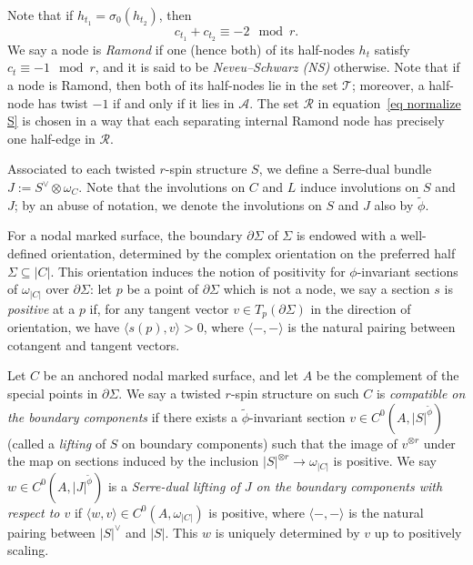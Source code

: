 \documentclass[11pt,a4paper]{article}
\theoremstyle{definition}
\theoremstyle{remark}
\numberwithin{equation}{section}
\begin{document}
Note that if $h_{t_1}=\sigma_0(h_{t_2})$, then
\begin{equation}\label{eq sum of twist at node}c_{t_1} + c_{t_2} \equiv -2 \mod r.\end{equation}
We say a node is \textit{Ramond} if one (hence both) of its half-nodes $h_t$ satisfy $c_t \equiv -1 \mod r$,  and it is said to be \textit{Neveu--Schwarz (NS)} otherwise. Note that if a node is Ramond, then both of its half-nodes lie in the set $\mathcal T$; moreover, a half-node has twist $-1$ if and only if it lies in $\mathcal A$. The set $\mathcal{R}$ in equation~\eqref{eq normalize S} is chosen in a way that each separating internal Ramond node has precisely one half-edge in $\mathcal{R}.$ 


Associated to each twisted $r$-spin structure $S$, we define a Serre-dual bundle $J:=S^{\vee} \otimes \omega_{C}$. Note that the involutions on $C$ and $L$ induce involutions on $S$ and $J$; by an abuse of notation, we denote the involutions on $S$ and $J$ also by $\widetilde{\phi}$.

For a nodal marked surface, the boundary ${\partial}\Sigma$ of $\Sigma$ is endowed with a well-defined orientation, determined by the complex orientation on the preferred half $\Sigma \subseteq |C|$. This orientation induces the notion of positivity for $\phi$-invariant sections of $\omega_{|C|}$ over ${\partial} \Sigma$: let $p$ be a point of $\partial \Sigma$ which is not a node, we say a section $s$ is \textit{positive} at a $p$ if, for any tangent vector $v \in T_p({\partial} \Sigma)$ in the direction of orientation, we have $\langle s(p), v \rangle > 0$, where $\langle -, - \rangle$ is the natural pairing between cotangent and tangent vectors.



Let $C$ be an anchored nodal marked surface, and let $A$ be the complement of the special points in $\partial \Sigma$.  We say a twisted $r$-spin structure on such $C$ is \textit{compatible on the boundary components} if there exists a $\widetilde{\phi}$-invariant section $v \in C^0\left(A, |S|^{\widetilde{\phi}}\right)$ 
(called a \textit{lifting} of $S$  on boundary components) such that the image of $v^{\otimes r}$ under the map on sections induced by the inclusion $|S|^{\otimes r} \to  \omega_{|C|}$ is positive.  
We say $w \in C^0\left(A, |J|^{\widetilde{\phi}}\right)$ is a \textit{Serre-dual lifting of $J$ on the boundary components with respect to $v$} if $\langle w, v \rangle \in C^0(A, \omega_{|C|})$ is positive, where $\langle -, - \rangle$ is the natural pairing between $|S|^{\vee}$ and $|S|$.  This $w$ is uniquely determined by $v$ up to positively scaling.
\end{document}
